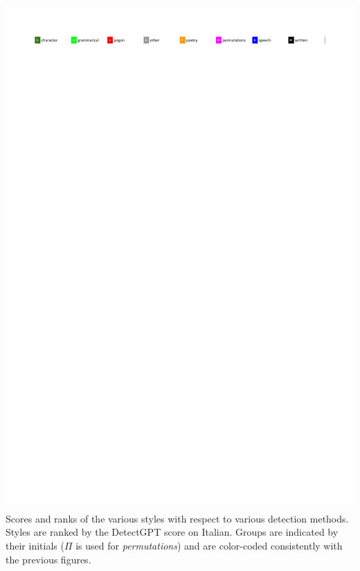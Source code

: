 \documentclass[
twocolumn,
]{ceurart}
\begin{document}
\begin{table}[!ht]
    \includegraphics[width=\textwidth]
    {legend.pdf}
    \centering
    \caption{Scores and ranks of the various styles with respect to various detection methods.
    Styles are ranked by the DetectGPT score on Italian. Groups are indicated by their initials (\( \Pi \) is used for \emph{permutations}) and are color-coded consistently with the previous figures.}
    \label{tab:megatable}
\end{table}
\end{document}
